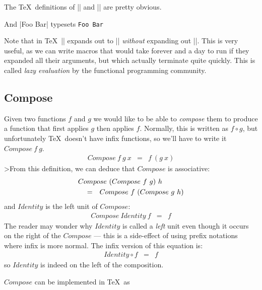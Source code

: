 The \TeX\ definitions of |\First| and |\Second| are pretty
obvious.

\begin{teX}
\def\First#1#2{#1}
\def\Second#1#2{#2}
\end{teX}

\def\foo#1{#1}
\def\bar#1{#1}

And |\First\foo\bar{Foo Bar}| typesets \texttt{\First\foo\bar{Foo Bar}}


Note that in \TeX\, |\First\foo\bar| expands out to
|\foo| {\em without\/} expanding out |\bar|.
This is very useful, as we can write macros that would take
forever and a day to run if they expanded all their arguments,
but which actually terminate quite quickly.  This is called
{\em lazy evaluation\/} by the functional programming community.

\subsection{Compose}

Given two functions $f$ and $g$ we would like to be able to {\em compose\/}
them to produce a function that first applies $g$ then applies $f$.
Normally, this is written as $f \circ g$, but unfortunately \TeX\ doesn't
have infix functions, so we'll have to write it $Compose~f~g$.
\begin{eqnarray*}
   Compose~f~g~x  &  =  &  f~(g~x)
\end{eqnarray*}
>From this definition, we can deduce that $Compose$ is associative:
\begin{eqnarray*}
   \start{Compose~(Compose~f~g)~h}  
   &  =  &  Compose~f~(Compose~g~h)
\end{eqnarray*}
and $Identity$ is the left unit of $Compose$:
\begin{eqnarray*}
        Compose~Identity~f  &  =  &  f 
\end{eqnarray*}
The reader may wonder why $Identity$ is called a {\em left\/} unit
even though it occurs on the right of the $Compose$ --- this is a side-effect
of using prefix notations where infix is more normal.  The infix version
of this equation is:
\begin{eqnarray*}
   Identity \circ f  &  =  &  f
\end{eqnarray*}
so $Identity$ is indeed on the left of the composition.

$Compose$ can be implemented in \TeX\ as
\begin{teX}
\def\Compose#1#2#3{#1{#2{#3}}}
\end{teX}

